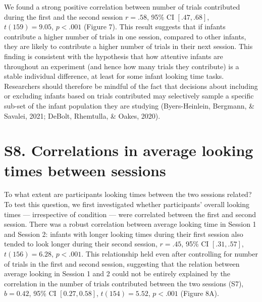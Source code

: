 \documentclass[
  man, donotrepeattitle,floatsintext]{apa6}
\begin{document}
We found a strong positive correlation between number of trials contributed during the first and the second session \(r = .58\), 95\% CI \([.47, .68]\), \(t(159) = 9.05\), \(p < .001\) (Figure 7).
This result suggests that if infants contribute a higher number of trials in one session, compared to other infants, they are likely to contribute a higher number of trials in their next session.
This finding is consistent with the hypothesis that how attentive infants are throughout an experiment (and hence how many trials they contribute) is a stable individual difference, at least for some infant looking time tasks.
Researchers should therefore be mindful of the fact that decisions about including or excluding infants based on trials contributed may selectively sample a specific sub-set of the infant population they are studying (Byers-Heinlein, Bergmann, \& Savalei, 2021; DeBolt, Rhemtulla, \& Oakes, 2020).

\newpage

\hypertarget{s8.-correlations-in-average-looking-times-between-sessions}{%
\section{S8. Correlations in average looking times between sessions}\label{s8.-correlations-in-average-looking-times-between-sessions}}

To what extent are participants looking times between the two sessions related?
To test this question, we first investigated whether participants' overall looking times --- irrespective of condition --- were correlated between the first and second session.
There was a robust correlation between average looking time in Session 1 and Session 2: infants with longer looking times during their first session also tended to look longer during their second session, \(r = .45\), 95\% CI \([.31, .57]\), \(t(156) = 6.28\), \(p < .001\).
This relationship held even after controlling for number of trials in the first and second session, suggesting that the relation between average looking in Session 1 and 2 could not be entirely explained by the correlation in the number of trials contributed between the two sessions (S7), \(b = 0.42\), 95\% CI \([0.27, 0.58]\), \(t(154) = 5.52\), \(p < .001\) (Figure 8A).
\end{document}
